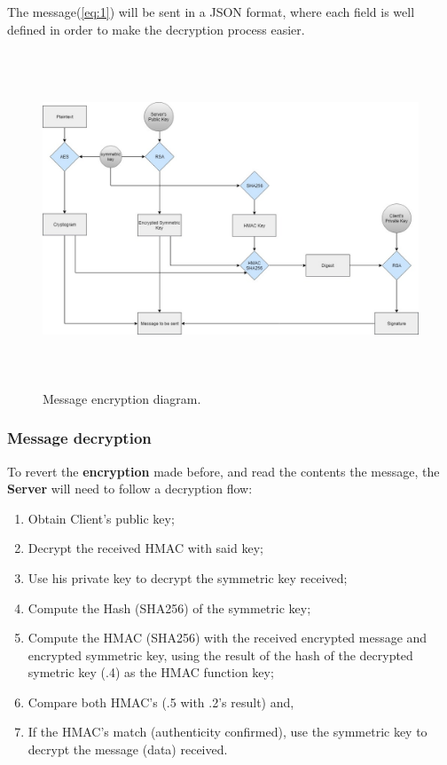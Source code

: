 The message(\ref{eq:1}) will be sent in a JSON format, where each field is well defined in order to make the decryption process easier.

\vspace*{5mm}

\begin{figure}[H]
\center
\includegraphics[height=10cm]{sections/img/encryption.jpg}
\caption{Message encryption diagram.}
\label{fig:messageencrypt}
\end{figure}

\vspace*{5mm}

\subsubsection{Message decryption}
To revert the \textbf{encryption} made before, and read  the contents the message, the \textbf{Server} will need to follow a decryption flow:

\begin{enumerate}[font=\bfseries]
    \item Obtain Client's public key;
    \item Decrypt the received HMAC with said key;
    \item Use his private key to decrypt the symmetric key received;
    \item Compute the Hash (SHA256) of the symmetric key;
    \item Compute the HMAC (SHA256) with the received encrypted message and encrypted symmetric key, using the result of the hash of the decrypted symetric key (.4) as the HMAC function key;
    \item Compare both HMAC’s (.5 with .2’s result) and,
    \item If the HMAC’s match (authenticity confirmed), use the symmetric key to decrypt the message (data) received.
\end{enumerate}

